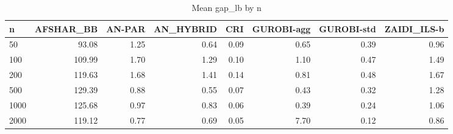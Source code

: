 \begin{table}[htbp]
\centering
\small
\caption{Mean gap\_lb by n}
\label{tab:E10b_state_of_the_art_60s_b60_by_n}
\begin{tabular}{lrrrrrrr}
\toprule
n & AFSHAR\_BB & AN-PAR & AN\_HYBRID & CRI & GUROBI-agg & GUROBI-std & ZAIDI\_ILS-b \\
\midrule
50 & 93.08 & 1.25 & 0.64 & 0.09 & 0.65 & 0.39 & 0.96 \\
100 & 109.99 & 1.70 & 1.29 & 0.10 & 1.10 & 0.47 & 1.49 \\
200 & 119.63 & 1.68 & 1.41 & 0.14 & 0.81 & 0.48 & 1.67 \\
500 & 129.39 & 0.88 & 0.55 & 0.07 & 0.43 & 0.32 & 1.28 \\
1000 & 125.68 & 0.97 & 0.83 & 0.06 & 0.39 & 0.24 & 1.06 \\
2000 & 119.12 & 0.77 & 0.69 & 0.05 & 7.70 & 0.12 & 0.86 \\
\bottomrule
\end{tabular}
\end{table}
